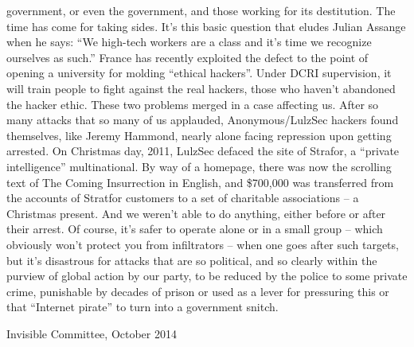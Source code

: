 \documentclass[landscape,twocolumn,letterpaper]{article}
\begin{document}
government, or even the government, and those working for its
destitution. The time has come for taking sides. It’s this basic
question that eludes Julian Assange when he says: “We high-tech
workers are a class and it’s time we recognize ourselves as such.”
France has recently exploited the defect to the point of opening a
university for molding “ethical hackers”. Under DCRI supervision, it
will train people to fight against the real hackers, those who haven’t
abandoned the hacker ethic. These two problems merged in a case
affecting us. After so many attacks that so many of us applauded,
Anonymous/LulzSec hackers found themselves, like Jeremy Hammond,
nearly alone facing repression upon getting arrested. On Christmas
day, 2011, LulzSec defaced the site of Strafor, a “private
intelligence” multinational. By way of a homepage, there was now the
scrolling text of The Coming Insurrection in English, and \$700,000
was transferred from the accounts of Stratfor customers to a set of
charitable associations – a Christmas present. And we weren’t able to
do anything, either before or after their arrest. Of course, it’s
safer to operate alone or in a small group – which obviously won’t
protect you from infiltrators – when one goes after such targets, but
it’s disastrous for attacks that are so political, and so clearly
within the purview of global action by our party, to be reduced by the
police to some private crime, punishable by decades of prison or used
as a lever for pressuring this or that “Internet pirate” to turn into
a government snitch.

\vspace{10 mm}
Invisible Committee, October 2014
\end{document}
